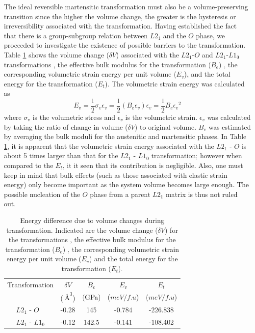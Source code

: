 \documentclass[%
preprint,
 amsmath,amssymb,
 aps,
prb,
showkeys,
]{revtex4-1}
\begin{document}
The ideal reversible martensitic transformation must also be a volume-preserving transition \cite{bhattacharya1998theory} since the higher the volume change, the greater is the hysteresis or irreversibility associated with the transformation. Having established the fact that there is a group-subgroup relation between $L2_1$  and the $O$ phase, we proceeded to investigate the existence of possible barriers to the transformation. Table  \ref{tab:volume} shows the volume change ($\delta V$) associated with the $L2_1$-$O$ and  $L2_1$-$L1_0$ transformations , the effective bulk modulus for the transformation ($B_e$) , the corresponding volumetric strain energy per unit volume ($E_v$), and the total energy for the transformation ($E_t$).  
The volumetric strain energy was calculated as
\begin{equation}
E_v = \frac{1}{2} \sigma_v \epsilon_v = \frac{1}{2} (B_e \epsilon_v ) \epsilon_v = \frac{1}{2} B_e {\epsilon_v}^2
\end{equation}
where $\sigma_v$ is the volumetric stress and $\epsilon_v$ is the volumetric strain. $\epsilon_v$ was calculated by taking the ratio of change in volume ($\delta V$) to original volume. $B_e$ was estimated by averaging the bulk moduli for the austenitic and martensitic phases. In Table  \ref{tab:volume}, it is apparent that the volumetric strain energy associated with the $L2_1$ - $O$ is about 5 times larger than that for the  $L2_1$ - $L1_0$ transformation; 
however when compared to the $E_t$, it it seen that its contribution is negligible. Also, one must keep in mind that bulk effects (such as those associated with elastic strain energy) only become important as the system volume becomes large enough. The possible nucleation of the $O$ phase from a parent $L2_1$ matrix is thus not ruled out.

\begin{table}
\begin{center}
\caption{Energy difference due to volume changes during transformation. Indicated are the volume change ($\delta V$) for the transformations , the effective bulk modulus for the transformation ($B_e$) , the corresponding volumetric strain energy per unit volume ($E_v$) and the total energy for the transformation ($E_t$).}
\setlength{\tabcolsep}{0.8cm}
\begin{tabular}{ccccc}
\hline
Transformation& $\delta V$ & $B_e$ &  $E_v$  & $E_t$ \\ 
 & ($\SI{}{\angstrom}^3$) &  (GPa)&   ($meV/ f.u$)& ($meV/ f.u$)  \\
\hline\hline
$L2_1$ - $O$ \ &  -0.28&   145&  -0.784  & -226.838 \\
\vspace{0.5em}
 $L2_1$ - $L1_0$ & -0.12 &   142.5 & -0.141 & -108.402  \\
\hline
\end{tabular}
\label{tab:volume}
\end{center}
\end{table}
\end{document}
